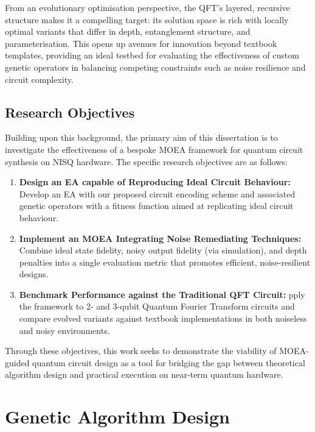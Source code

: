 \documentclass[11pt,a4paper]{article}
\begin{document}
From an evolutionary optimisation perspective, the QFT's layered, recursive structure makes it a compelling target: its solution space is rich with locally optimal variants that differ in depth, entanglement structure, and parameterisation. This opens up avenues for innovation beyond textbook templates, providing an ideal testbed for evaluating the effectiveness of custom genetic operators in balancing competing constraints such as noise resilience and circuit complexity.

\subsection{Research Objectives}\label{sec:objectives}
Building upon this background, the primary aim of this dissertation is to investigate the effectiveness of a bespoke MOEA framework for quantum circuit synthesis on NISQ hardware. The specific research objectives are as follows:

\begin{enumerate}
    \item \textbf{Design an EA capable of Reproducing Ideal Circuit Behaviour:} Develop an EA with our proposed circuit encoding scheme and associated genetic operators with a fitness function aimed at replicating ideal circuit behaviour.
    
    \item \textbf{Implement an MOEA Integrating Noise Remediating Techniques:} Combine ideal state fidelity, noisy output fidelity (via simulation), and depth penalties into a single evaluation metric that promotes efficient, noise-resilient designs.
    
    \item \textbf{Benchmark Performance against the Traditional QFT Circuit:} pply the framework to 2- and 3-qubit Quantum Fourier Transform circuits and compare evolved variants against textbook implementations in both noiseless and noisy environments.
\end{enumerate}

Through these objectives, this work seeks to demonstrate the viability of MOEA-guided quantum circuit design as a tool for bridging the gap between theoretical algorithm design and practical execution on near-term quantum hardware.

%
%
\section{Genetic Algorithm Design}\label{sec:design}
\end{document}
